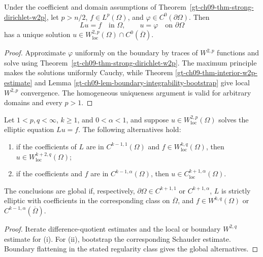 \begin{corollary}
\label{gt-ch09-cor-strong-dirichlet-continuous-data}
Under the coefficient and domain assumptions of
Theorem~\ref{gt-ch09-thm-strong-dirichlet-w2p}, let
$p>n/2$, $f\in L^p(\Omega)$, and
$\varphi\in C^0(\partial\Omega)$.  Then
\[
Lu=f\quad\text{in }\Omega,\qquad u=\varphi\quad\text{on }\partial\Omega
\]
has a unique solution
$u\in W^{2,p}_{\mathrm{loc}}(\Omega)\cap C^0(\overline\Omega)$.
\end{corollary}
\begin{proof}
\sketch Approximate $\varphi$ uniformly on the boundary by traces of
$W^{2,p}$ functions and solve using
Theorem~\ref{gt-ch09-thm-strong-dirichlet-w2p}.  The maximum principle makes
the solutions uniformly Cauchy, while Theorem
\ref{gt-ch09-thm-interior-w2p-estimate} and Lemma
\ref{gt-ch09-lem-boundary-integrability-bootstrap} give local $W^{2,p}$
convergence.  The homogeneous uniqueness argument is valid for arbitrary
domains and every $p>1$.
\end{proof}

\begin{theorem}
\label{gt-ch09-thm-higher-regularity-strong-solutions}
Let $1<p,q<\infty$, $k\ge1$, and $0<\alpha<1$, and suppose
$u\in W^{2,p}_{\mathrm{loc}}(\Omega)$ solves the elliptic equation $Lu=f$.
The following alternatives hold:
\begin{enumerate}
\item[(i)] if the coefficients of $L$ are in $C^{k-1,1}(\Omega)$ and
$f\in W^{k,q}_{\mathrm{loc}}(\Omega)$, then
$u\in W^{k+2,q}_{\mathrm{loc}}(\Omega)$;
\item[(ii)] if the coefficients and $f$ are in
$C^{k-1,\alpha}(\Omega)$, then
$u\in C^{k+1,\alpha}_{\mathrm{loc}}(\Omega)$.
\end{enumerate}
The conclusions are global if, respectively,
$\partial\Omega\in C^{k+1,1}$ or $C^{k+1,\alpha}$, $L$ is strictly elliptic
with coefficients in the corresponding class on $\overline\Omega$, and
$f\in W^{k,q}(\Omega)$ or $C^{k-1,\alpha}(\overline\Omega)$.
\end{theorem}
\begin{proof}
\sketch Iterate difference-quotient estimates and the local or boundary
$W^{2,q}$ estimate for (i).  For (ii), bootstrap the corresponding Schauder
estimate.  Boundary flattening in the stated regularity class gives the
global alternatives.
\end{proof}

